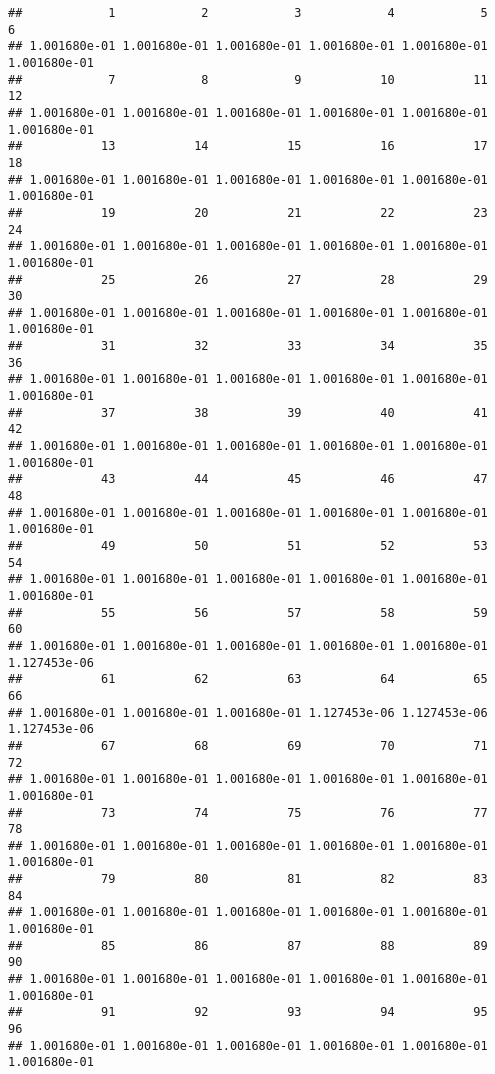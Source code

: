 \documentclass[
]{article}
\begin{document}
\begin{verbatim}
##            1            2            3            4            5            6 
## 1.001680e-01 1.001680e-01 1.001680e-01 1.001680e-01 1.001680e-01 1.001680e-01 
##            7            8            9           10           11           12 
## 1.001680e-01 1.001680e-01 1.001680e-01 1.001680e-01 1.001680e-01 1.001680e-01 
##           13           14           15           16           17           18 
## 1.001680e-01 1.001680e-01 1.001680e-01 1.001680e-01 1.001680e-01 1.001680e-01 
##           19           20           21           22           23           24 
## 1.001680e-01 1.001680e-01 1.001680e-01 1.001680e-01 1.001680e-01 1.001680e-01 
##           25           26           27           28           29           30 
## 1.001680e-01 1.001680e-01 1.001680e-01 1.001680e-01 1.001680e-01 1.001680e-01 
##           31           32           33           34           35           36 
## 1.001680e-01 1.001680e-01 1.001680e-01 1.001680e-01 1.001680e-01 1.001680e-01 
##           37           38           39           40           41           42 
## 1.001680e-01 1.001680e-01 1.001680e-01 1.001680e-01 1.001680e-01 1.001680e-01 
##           43           44           45           46           47           48 
## 1.001680e-01 1.001680e-01 1.001680e-01 1.001680e-01 1.001680e-01 1.001680e-01 
##           49           50           51           52           53           54 
## 1.001680e-01 1.001680e-01 1.001680e-01 1.001680e-01 1.001680e-01 1.001680e-01 
##           55           56           57           58           59           60 
## 1.001680e-01 1.001680e-01 1.001680e-01 1.001680e-01 1.001680e-01 1.127453e-06 
##           61           62           63           64           65           66 
## 1.001680e-01 1.001680e-01 1.001680e-01 1.127453e-06 1.127453e-06 1.127453e-06 
##           67           68           69           70           71           72 
## 1.001680e-01 1.001680e-01 1.001680e-01 1.001680e-01 1.001680e-01 1.001680e-01 
##           73           74           75           76           77           78 
## 1.001680e-01 1.001680e-01 1.001680e-01 1.001680e-01 1.001680e-01 1.001680e-01 
##           79           80           81           82           83           84 
## 1.001680e-01 1.001680e-01 1.001680e-01 1.001680e-01 1.001680e-01 1.001680e-01 
##           85           86           87           88           89           90 
## 1.001680e-01 1.001680e-01 1.001680e-01 1.001680e-01 1.001680e-01 1.001680e-01 
##           91           92           93           94           95           96 
## 1.001680e-01 1.001680e-01 1.001680e-01 1.001680e-01 1.001680e-01 1.001680e-01 

\end{verbatim}
\end{document}
